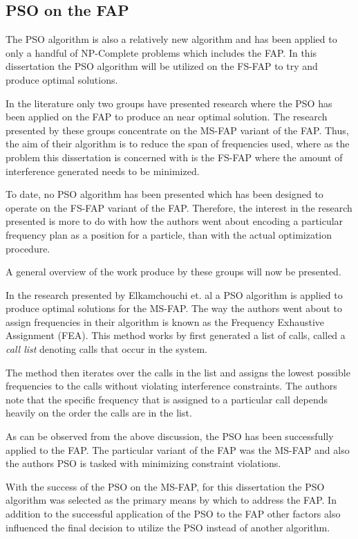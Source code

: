 \subsection{PSO on the FAP}
The PSO algorithm is also a relatively new algorithm and has been applied to only a handful of NP-Complete problems which includes the FAP. In this dissertation the PSO algorithm will be utilized on the FS-FAP to try and produce optimal solutions. 

In the literature only two groups have presented research where the PSO has been applied on the FAP to produce an near optimal solution. The research presented by these groups concentrate on the MS-FAP variant of the FAP. Thus, the aim of their algorithm is to reduce the span of frequencies used, where as the problem this dissertation is concerned with is the FS-FAP where the amount of interference generated needs to be minimized. 

To date, no PSO algorithm has been presented which has been designed to operate on the FS-FAP variant of the FAP. Therefore, the interest in the research presented is more to do with how the authors went about encoding a particular frequency plan as a position for a particle, than with the actual optimization procedure.

A general overview of the work produce by these groups will now be presented.

In the research presented by Elkamchouchi et. al\cite{EgyptFAPPSO} a PSO algorithm is applied to produce optimal solutions for the MS-FAP. The way the authors went about to assign frequencies in their algorithm is known as the Frequency Exhaustive Assignment (FEA).
This method works by first generated a list of calls, called a \emph{call list} denoting calls that occur in the system\cite{EgyptFAPPSO}. 

The method then iterates over the calls in the list and assigns the lowest possible frequencies to the calls without violating interference constraints\cite{EgyptFAPPSO}. The authors note that the specific frequency that is assigned to a particular call depends heavily on the order the calls are in the list\cite{EgyptFAPPSO}.

As can be observed from the above discussion, the PSO has been successfully applied to the FAP. The particular variant of the FAP was the MS-FAP and also the authors PSO is tasked with minimizing constraint violations.

With the success of the PSO on the MS-FAP, for this dissertation the PSO algorithm was selected as the primary means by which to address the FAP. In addition to the successful application of the PSO to the FAP other factors also influenced the final decision to utilize the PSO instead of another algorithm.

